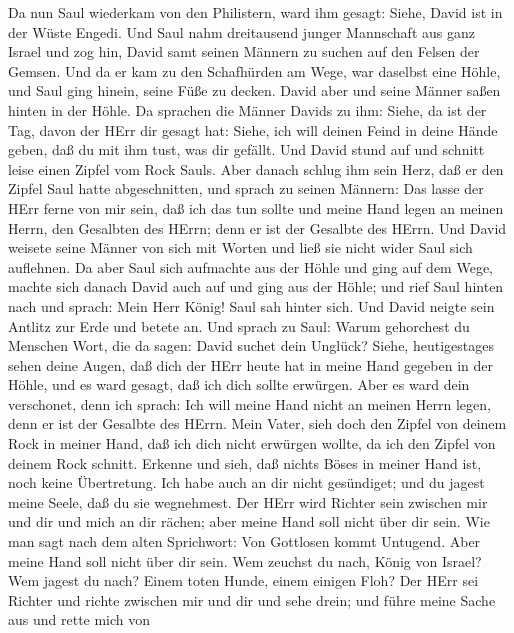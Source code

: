  Da nun Saul wiederkam von den Philistern, ward ihm gesagt:
Siehe, David ist in der Wüste Engedi.  Und Saul nahm
dreitausend junger Mannschaft aus ganz Israel und zog hin, David samt
seinen Männern zu suchen auf den Felsen der Gemsen.  Und da
er kam zu den Schafhürden am Wege, war daselbst eine Höhle, und Saul
ging hinein, seine Füße zu decken. David aber und seine Männer saßen
hinten in der Höhle.  Da sprachen die Männer Davids zu ihm:
Siehe, da ist der Tag, davon der HErr dir gesagt hat: Siehe, ich will
deinen Feind in deine Hände geben, daß du mit ihm tust, was dir gefällt.
Und David stund auf und schnitt leise einen Zipfel vom Rock Sauls.
 Aber danach schlug ihm sein Herz, daß er den Zipfel Saul
hatte abgeschnitten,  und sprach zu seinen Männern: Das
lasse der HErr ferne von mir sein, daß ich das tun sollte und meine Hand
legen an meinen Herrn, den Gesalbten des HErrn; denn er ist der Gesalbte
des HErrn.  Und David weisete seine Männer von sich mit
Worten und ließ sie nicht wider Saul sich auflehnen. Da aber Saul sich
aufmachte aus der Höhle und ging auf dem Wege,  machte sich
danach David auch auf und ging aus der Höhle; und rief Saul hinten nach
und sprach: Mein Herr König! Saul sah hinter sich. Und David neigte sein
Antlitz zur Erde und betete an.  Und sprach zu Saul: Warum
gehorchest du Menschen Wort, die da sagen: David suchet dein Unglück?
 Siehe, heutigestages sehen deine Augen, daß dich der HErr
heute hat in meine Hand gegeben in der Höhle, und es ward gesagt, daß
ich dich sollte erwürgen. Aber es ward dein verschonet, denn ich sprach:
Ich will meine Hand nicht an meinen Herrn legen, denn er ist der
Gesalbte des HErrn.  Mein Vater, sieh doch den Zipfel von
deinem Rock in meiner Hand, daß ich dich nicht erwürgen wollte, da ich
den Zipfel von deinem Rock schnitt. Erkenne und sieh, daß nichts Böses
in meiner Hand ist, noch keine Übertretung. Ich habe auch an dir nicht
gesündiget; und du jagest meine Seele, daß du sie wegnehmest.
 Der HErr wird Richter sein zwischen mir und dir und mich
an dir rächen; aber meine Hand soll nicht über dir sein. 
Wie man sagt nach dem alten Sprichwort: Von Gottlosen kommt Untugend.
Aber meine Hand soll nicht über dir sein.  Wem zeuchst du
nach, König von Israel? Wem jagest du nach? Einem toten Hunde, einem
einigen Floh?  Der HErr sei Richter und richte zwischen mir
und dir und sehe drein; und führe meine Sache aus und rette mich von
